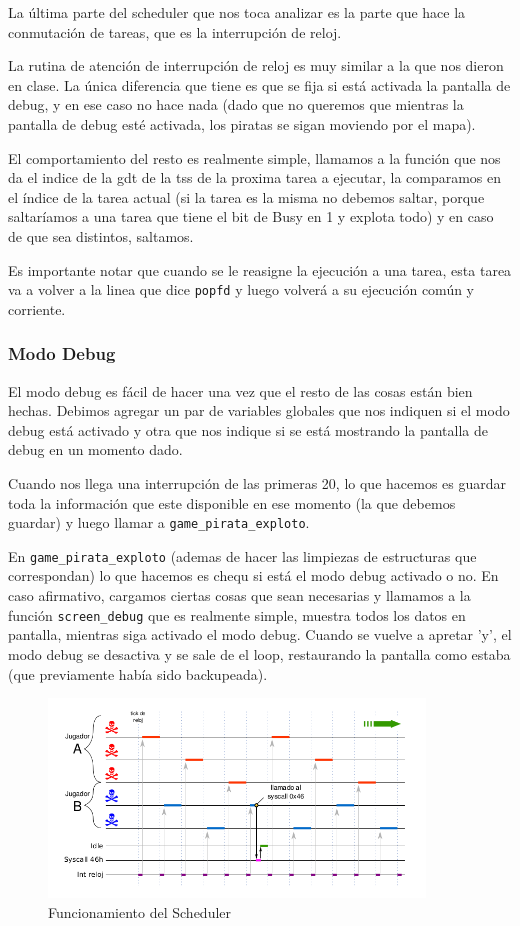 La última parte del scheduler que nos toca analizar es la parte que hace la conmutación de tareas, que es la interrupción de reloj.
 
La rutina de atención de interrupción de reloj es muy similar a la que nos dieron en clase. La única diferencia que tiene es que se fija si está activada la pantalla de debug, y en ese caso no hace nada (dado que no queremos que mientras la pantalla de debug esté activada, los piratas se sigan moviendo por el mapa).
 
El comportamiento del resto es realmente simple, llamamos a la función que nos da el indice de la gdt de la tss de la proxima tarea a ejecutar, la comparamos en el índice de la tarea actual (si la tarea es la misma no debemos saltar, porque saltaríamos a una tarea que tiene el bit de Busy en 1 y explota todo) y en caso de que sea distintos, saltamos.
 
Es importante notar que cuando se le reasigne la ejecución a una tarea, esta tarea va a volver a la linea que dice \texttt{popfd} y luego volverá a su ejecución común y corriente.
 
\subsubsection*{Modo Debug}
 
El modo debug es fácil de hacer una vez que el resto de las cosas están bien hechas. Debimos agregar un par de variables globales que nos indiquen si el modo debug está activado y otra que nos indique si se está mostrando la pantalla de debug en un momento dado.
 
Cuando nos llega una interrupción de las primeras 20, lo que hacemos es guardar toda la información que este disponible en ese momento (la que debemos guardar) y luego llamar a \texttt{game_pirata_exploto}.
 
En \texttt{game_pirata_exploto} (ademas de hacer las limpiezas de estructuras que correspondan) lo que hacemos es chequ si está el modo debug activado o no. En caso afirmativo, cargamos ciertas cosas que sean necesarias y llamamos a la función \texttt{screen_debug} que es realmente simple, muestra todos los datos en pantalla, mientras siga activado el modo debug. Cuando se vuelve a apretar 'y', el modo debug se desactiva y se sale de el loop, restaurando la pantalla como estaba (que previamente había sido backupeada).
 
\begin{figure}[ht!]
\centering
\includegraphics[width=100mm]{imagenes/scheduler.png}
\caption{Funcionamiento del Scheduler}
\end{figure}

